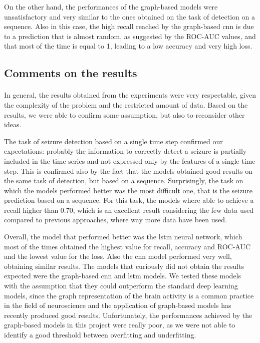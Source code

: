 On the other hand, the performances of the graph-based models were unsatisfactory and very similar to the ones obtained on the task of detection on a sequence. Also in this case, the high recall reached by the graph-based \acs{cnn} is due to a prediction that is almost random, as suggested by the ROC-AUC values, and that most of the time is equal to 1, leading to a low accuracy and very high loss.


\subsection{Comments on the results}
\paragraph{} In general, the results obtained from the experiments were very respectable, given the complexity of the problem and the restricted amount of data. Based on the results, we were able to confirm some assumption, but also to reconsider other ideas.

The task of seizure detection based on a single time step confirmed our expectations: probably the information to correctly detect a seizure is partially included in the time series and not expressed only by the features of a single time step. This is confirmed also by the fact that the models obtained good results on the same task of detection, but based on a sequence. Surprisingly, the task on which the models performed better was the most difficult one, that is the seizure prediction based on a sequence. For this task, the models where able to achieve a recall higher than 0.70, which is an excellent result considering the few data used compared to previous approaches, where way more data have been used.

Overall, the model that performed better was the \acs{lstm} neural network, which most of the times obtained the highest value for recall, accuracy and ROC-AUC and the lowest value for the loss. Also the \acs{cnn} model performed very well, obtaining similar results. The models that curiously did not obtain the results expected were the graph-based \acs{cnn} and \acs{lstm} models. We tested these models with the assumption that they could outperform the standard deep learning models, since the graph representation of the brain activity is a common practice in the field of neuroscience and the application of graph-based models has recently produced good results. Unfortunately, the performances achieved by the graph-based models in this project were really poor, as we were not able to identify a good threshold between overfitting and underfitting.

